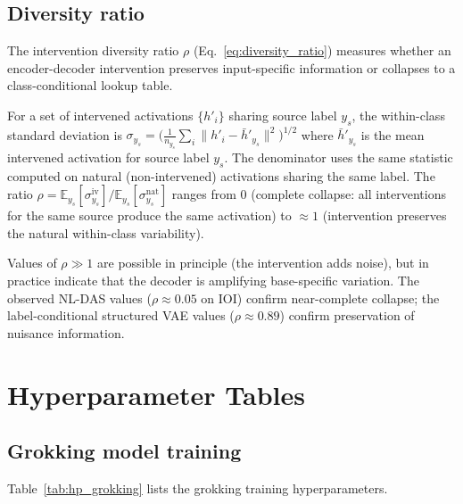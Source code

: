 \subsection{Diversity ratio}
\label{app:diversity_ratio}

The intervention diversity ratio $\rho$ (Eq.~\ref{eq:diversity_ratio})
measures whether an encoder-decoder intervention preserves input-specific
information or collapses to a class-conditional lookup table.

For a set of intervened activations $\{h'_i\}$ sharing source label $y_s$,
the within-class standard deviation is
$\sigma_{y_s} = \bigl(\frac{1}{n_{y_s}} \sum_i \|h'_i - \bar{h}'_{y_s}\|^2
\bigr)^{1/2}$
where $\bar{h}'_{y_s}$ is the mean intervened activation for source label $y_s$.
The denominator uses the same statistic computed on natural (non-intervened)
activations sharing the same label. The ratio $\rho = \mathbb{E}_{y_s}[\sigma_{y_s}^{\text{iv}}]
/ \mathbb{E}_{y_s}[\sigma_{y_s}^{\text{nat}}]$ ranges from 0 (complete collapse: all
interventions for the same source produce the same activation) to
$\approx 1$ (intervention preserves the natural within-class variability).

Values of $\rho \gg 1$ are possible in principle (the intervention adds noise),
but in practice indicate that the decoder is amplifying base-specific variation.
The observed NL-DAS values ($\rho \approx 0.05$ on IOI) confirm near-complete
collapse; the label-conditional structured VAE values ($\rho \approx 0.89$) confirm
preservation of nuisance information.


\section{Hyperparameter Tables}
\label{app:hyperparameters}

\subsection{Grokking model training}

Table~\ref{tab:hp_grokking} lists the grokking training hyperparameters.

